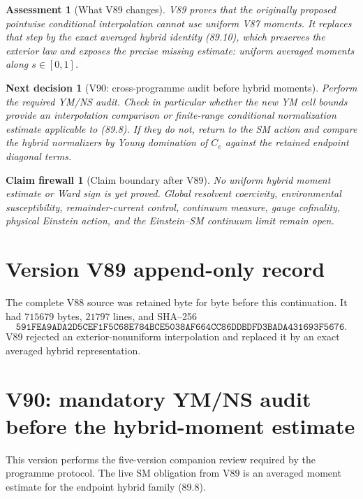 \documentclass[11pt]{article}
\newtheorem{firewall}[theorem]{Claim firewall}
\newtheorem{decision}[theorem]{Next decision}
\newtheorem{assessment}[theorem]{Assessment}
\theoremstyle{remark}
\begin{document}
\begin{assessment}[What V89 changes]
\label{ass:v17v89-status}
V89 proves that the originally proposed pointwise conditional
interpolation cannot use uniform V87 moments.  It replaces that step by
the exact averaged hybrid identity (89.10), which preserves the
exterior law and exposes the precise missing estimate: uniform averaged
moments along \(s\in[0,1]\).
\end{assessment}

\begin{decision}[V90: cross-programme audit before hybrid moments]
\label{dec:v17v89-next}
Perform the required YM/NS audit.  Check in particular whether the new
YM cell bounds provide an interpolation comparison or finite-range
conditional normalization estimate applicable to (89.8).  If they do
not, return to the SM action and compare the hybrid normalizers by
Young domination of \(C_e\) against the retained endpoint diagonal
terms.
\end{decision}

\begin{firewall}[Claim boundary after V89]
\label{fire:v17v89}
No uniform hybrid moment estimate or Ward sign is yet proved.  Global
resolvent coercivity, environmental susceptibility, remainder-current
control, continuum measure, gauge cofinality, physical Einstein
action, and the Einstein--SM continuum limit remain open.
\end{firewall}

\section*{Version V89 append-only record}
The complete V88 source was retained byte for byte before this
continuation.  It had \(715679\) bytes, \(21797\) lines, and SHA--256
\[
 \texttt{591FEA9ADA2D5CEF1F5C68E784BCE5038AF664CC86DDBDFD3BADA431693F5676}.
\]
V89 rejected an exterior-nonuniform interpolation and replaced it by
an exact averaged hybrid representation.


\section{V90: mandatory YM/NS audit before the hybrid-moment estimate}
\label{sec:v17v90}

This version performs the five-version companion review required by
the programme protocol.  The live SM obligation from V89 is an
averaged moment estimate for the endpoint hybrid family (89.8).
\end{document}
